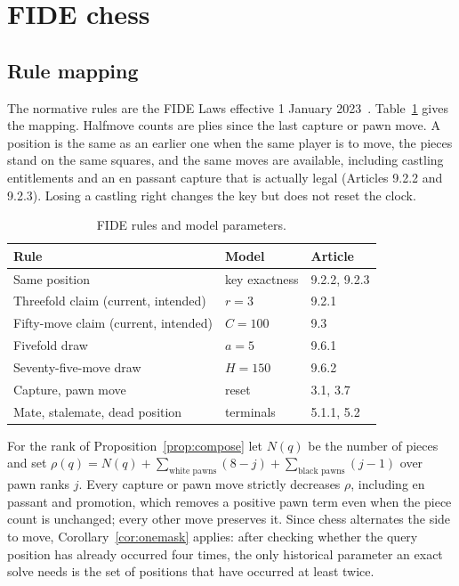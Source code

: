 \documentclass[journal]{IEEEtran}
\theoremstyle{definition}
\theoremstyle{remark}
\begin{document}
\section{FIDE chess}\label{sec:chess}

\subsection{Rule mapping}
The normative rules are the FIDE Laws effective 1 January 2023~\cite{fide}. Table~\ref{tab:rules} gives the mapping. Halfmove counts are plies since the last capture or pawn move. A position is the same as an earlier one when the same player is to move, the pieces stand on the same squares, and the same moves are available, including castling entitlements and an en passant capture that is actually legal (Articles 9.2.2 and 9.2.3). Losing a castling right changes the key but does not reset the clock.

\begin{table}[t]\centering\footnotesize
\caption{FIDE rules and model parameters.}
\label{tab:rules}
\begin{tabular}{@{}lll@{}}\toprule
Rule & Model & Article\\ \midrule
Same position & key exactness & 9.2.2, 9.2.3\\
Threefold claim (current, intended) & $r=3$ & 9.2.1\\
Fifty-move claim (current, intended) & $C=100$ & 9.3\\
Fivefold draw & $a=5$ & 9.6.1\\
Seventy-five-move draw & $H=150$ & 9.6.2\\
Capture, pawn move & reset & 3.1, 3.7\\
Mate, stalemate, dead position & terminals & 5.1.1, 5.2\\ \bottomrule
\end{tabular}
\end{table}

For the rank of Proposition~\ref{prop:compose} let $N(q)$ be the number of pieces and set $\rho(q)=N(q)+\sum_{\text{white pawns}}(8-j)+\sum_{\text{black pawns}}(j-1)$ over pawn ranks $j$. Every capture or pawn move strictly decreases $\rho$, including en passant and promotion, which removes a positive pawn term even when the piece count is unchanged; every other move preserves it. Since chess alternates the side to move, Corollary~\ref{cor:onemask} applies: after checking whether the query position has already occurred four times, the only historical parameter an exact solve needs is the set of positions that have occurred at least twice.
\end{document}
